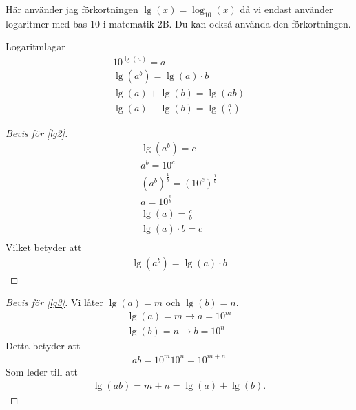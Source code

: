 Här använder jag förkortningen $\lg(x) = \log_{10}(x)$ då vi endast använder logaritmer med bas 10 i matematik 2B. Du kan också använda den förkortningen.

\begin{theorem}{Logaritmlagar}
	\begin{align}
	10^{\lg(a)}=a \\
	\lg(a^b) = \lg(a)\cdot b \label{lg2} \\
	\lg(a)+\lg(b) = \lg(ab) \label{lg3} \\
	\lg(a)-\lg(b) = \lg\left(\frac{a}{b}\right) \label{lg4}
\end{align} 
\end{theorem}	

\begin{proof}[Bevis för \eqref{lg2}]
	\begin{align}
		\lg(a^b) = c \\ 
		a^b = 10^c \\
		(a^b)^{\frac{1}{b}} = (10^c)^{\frac{1}{b}} \\
		a = 10^{\frac{c}{b}} \\
		\lg(a) = \frac{c}{b} \\
		\lg(a)\cdot b = c \\
	\end{align}
	Vilket betyder att
	\begin{align}
		\lg(a^b) = \lg(a)\cdot b
	\end{align}
\end{proof}

\begin{proof}[Bevis för \eqref{lg3}]
	Vi låter $\lg(a) = m$ och $\lg(b) = n$.
	\begin{align}
		\lg(a) = m \rightarrow a = 10^m \\
		\lg(b) = n \rightarrow b = 10^n
	\end{align}
	Detta betyder att
	\begin{align}
		ab = 10^m10^n = 10^{m+n}
	\end{align}
	Som leder till att
	\begin{align}
		\lg(ab) = m+n = \lg(a)+\lg(b).
	\end{align}
\end{proof}

